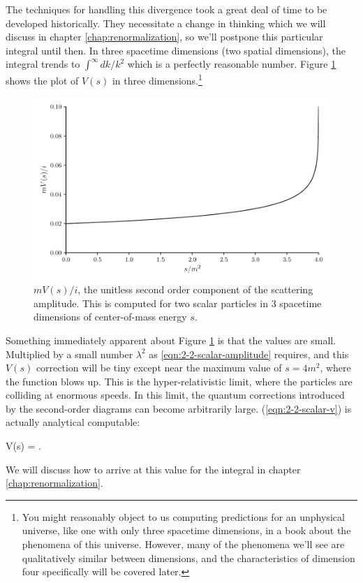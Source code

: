 The techniques for handling this divergence took a great deal of time to be developed historically. They necessitate a change in thinking which we will discuss in chapter \ref{chap:renormalization}, so we'll postpone this particular integral until then. In three spacetime dimensions (two spatial dimensions), the integral trends to $\int^\infty dk /k^2$ which is a perfectly reasonable number. Figure \ref{fig:2-2-scalar-v-3d} shows the plot of $V(s)$ in three dimensions.\footnote{You might reasonably object to us computing predictions for an unphysical universe, like one with only three spacetime dimensions, in a book about the phenomena of this universe. However, many of the phenomena we'll see are qualitatively similar between dimensions, and the characteristics of dimension four specifically will be covered later.}

\begin{figure}
  \centering
  \includegraphics[width=\linewidth]{figs/2-2-scalar-v-3d.pdf}
  \caption{$mV(s)/i$, the unitless second order component of the scattering amplitude. This is computed for two scalar particles in 3 spacetime dimensions of center-of-mass energy $s$.}
  \label{fig:2-2-scalar-v-3d}
\end{figure}

Something immediately apparent about Figure \ref{fig:2-2-scalar-v-3d} is that the values are small. Multiplied by a small number $\lambda^2$ as \ref{eqn:2-2-scalar-amplitude} requires, and this $V(s)$ correction will be tiny except near the maximum value of $s=4m^2$, where the function blows up. This is the hyper-relativistic limit, where the particles are colliding at enormous speeds. In this limit, the quantum corrections introduced by the second-order diagrams can become arbitrarily large. (\ref{eqn:2-2-scalar-v}) is actually analytical computable:
\begin{e}
  V(s) = \ln {}.
\end{e}
We will discuss how to arrive at this value for the integral in chapter \ref{chap:renormalization}.

